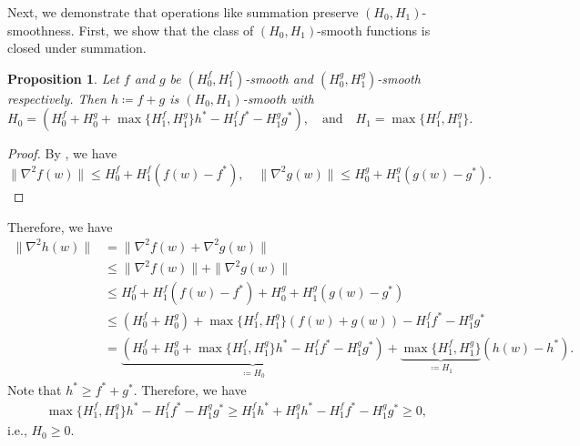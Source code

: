 \documentclass[a4paper,11pt]{article}
\newcommand{\1}{\mathbbm{1}}
\newcommand{\eqdef}{\coloneqq}
\theoremstyle{plain}
\newtheorem{proposition}[theorem]{Proposition}
\begin{document}
Next, we demonstrate that operations like summation preserve $(H_0, H_1)$-smoothness. First, we show that the class of $(H_0, H_1)$-smooth functions is closed under summation. 
\begin{proposition}Let $f$ and $g$ be $(H_0^f,H_1^f)$-smooth and $(H_0^g,H_1^g)$-smooth respectively. Then $h \eqdef f + g$ is $(H_0,H_1)$-smooth with 
\[
H_0 = (H_0^f + H_0^g + \max\{H_1^f,H_1^g\} h^* - H_1^ff^* - H_1^gg^*), \quad \text{and} \quad H_1 = \max\{H_1^f,H_1^g\}.
\]
\end{proposition}
\begin{proof}
    By , we have 
    \[
    \|\nabla^2f(w)\|\le H_0^f + H_1^f(f(w)-f^*), \quad \|\nabla^2g(w)\|\le H_0^g + H_1^g(g(w)-g^*).
    \]
\end{proof}
Therefore, we have 
\begin{align*}
    \|\nabla^2h(w)\| &= \|\nabla^2f(w) + \nabla^2g(w)\|\\
    &\le \|\nabla^2f(w)\| + \|\nabla^2g(w)\|\\
    &\le H_0^f + H_1^f(f(w)-f^*) + H_0^g + H_1^g(g(w)-g^*)\\
    &\le (H_0^f + H_0^g) + \max\{H_1^f,H_1^g\}(f(w)+g(w)) - H_1^ff^* - H_1^gg^*\\
    &= \underbrace{(H_0^f + H_0^g + \max\{H_1^f,H_1^g\} h^* - H_1^ff^* - H_1^gg^*)}_{\eqdef H_0} + \underbrace{\max\{H_1^f,H_1^g\}}_{\eqdef H_1}(h(w) - h^*).
\end{align*}
Note that $h^* \ge f^* + g^*.$ Therefore, we have 
\begin{align*}
    \max\{H_1^f,H_1^g\}h^* - H_1^ff^* - H_1^gg^* \ge H_1^fh^* + H_1^gh^* - H_1^ff^* - H_1^gg^*  \ge 0,
\end{align*}
i.e., $H_0 \ge 0$.
\end{document}
